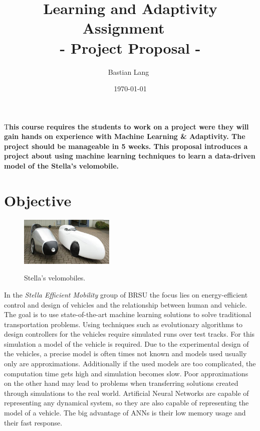 \documentclass[	DIV=calc,%
				paper=a4,%
				fontsize=11pt,%
				twocolumn]{scrartcl}	 %
\title{Learning and Adaptivity
\\ Assignment ~\upperRomannumeral{3} \\ - Project Proposal - }%
\author{Bastian Lang~}	%
\date{\today}
\newcommand{\initial}[1]{%
     \lettrine[lines=3,lhang=0.3,nindent=0em]{
     				\color{brsublue}
     				{\textsf{#1}}}{}}
\begin{document}
\maketitle
\thispagestyle{fancy} %
\initial{T}\textbf{his course requires the students to work on a project were they will gain hands on experience with Machine Learning \& Adaptivity. The project should be manageable in 5 weeks. This proposal introduces a project about using machine learning techniques to learn a data-driven model of the Stella's velomobile.}


\section{Objective}
   
	\begin{figure}[h]
  		\centering
  		\caption{Stella's velomobiles.}
  		\includegraphics[width=0.4\textwidth]{./data/velomobile.jpg}
  		\label{fig:stella}
	\end{figure}   

	In the \textit{Stella Efficient Mobility} group of BRSU the focus lies on energy-efficient control and design of vehicles and the relationship between human and vehicle. 
	The goal is to use state-of-the-art machine learning solutions to solve traditional transportation problems\cite{stella}.
	Using techniques such as evolutionary algorithms to design controllers for the vehicles require simulated runs over test tracks.
	For this simulation a model of the vehicle is required.
	Due to the experimental design of the vehicles, a precise model is often times not known and models used usually only are approximations.
	Additionally if the used models are too complicated, the computation time gets high and simulation becomes slow.
	Poor approximations on the other hand may lead to problems when transferring solutions created through simulations to the real world.
	Artificial Neural Networks are capable of representing any dynamical system, so they are also capable of representing the model of a vehicle.
	The big advantage of ANNs is their low memory usage and their fast response.
	
\end{document}
